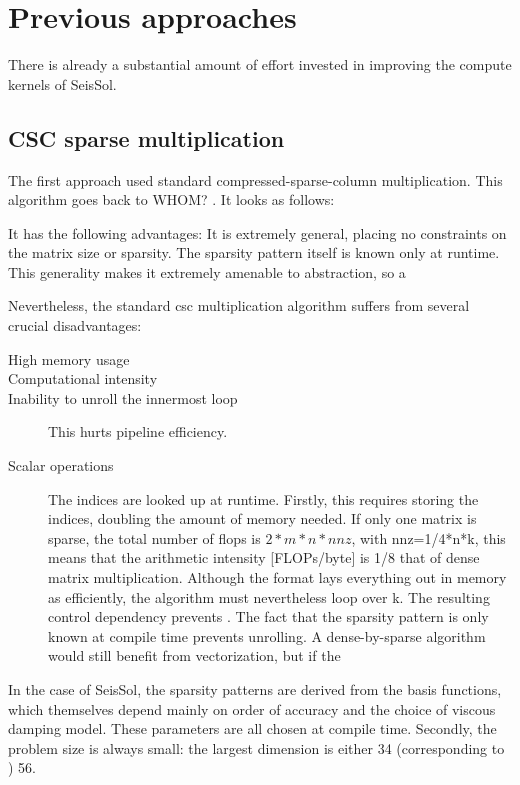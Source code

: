 \section{Previous approaches}

There is already a substantial amount of effort invested in improving the compute kernels of SeisSol. 

\subsection{CSC sparse multiplication}
  The first approach used standard compressed-sparse-column multiplication. This algorithm goes back to WHOM? . It looks as follows:


  It has the following advantages: It is extremely general, placing no constraints on the matrix size or sparsity. 
  The sparsity pattern itself is known only at runtime. This generality makes it extremely amenable to abstraction, so a 

  Nevertheless, the standard csc multiplication algorithm suffers from several crucial disadvantages: 

\begin{description}
  \item[High memory usage]

  \item[Computational intensity]

  \item[Inability to unroll the innermost loop] This hurts pipeline efficiency.

  \item[Scalar operations]

  The indices are looked up at runtime. Firstly, this requires storing the indices, doubling the amount of memory needed. If only one matrix is sparse, the total number of flops is $2 * m * n * nnz$, with nnz=1/4*n*k, this means that the arithmetic intensity [FLOPs/byte] is 1/8 that of dense matrix multiplication. 
  Although the format lays everything out in memory as efficiently, the algorithm must nevertheless loop over k. The resulting control dependency prevents . The fact that the sparsity pattern is only known at compile time prevents unrolling. 
  A dense-by-sparse algorithm would still benefit from vectorization, but if the 

\end{description}


In the case of SeisSol, the sparsity patterns are derived from the basis functions, which themselves depend mainly on order of accuracy and the choice of viscous damping model. These parameters are all chosen at compile time. Secondly, the problem size is always small: the largest dimension is either 34 (corresponding to ) 56. 

